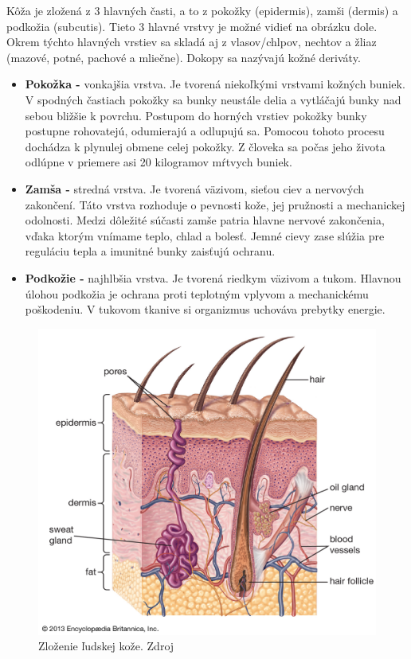 Kôža je zložená z 3 hlavných časti, a to z pokožky (epidermis), zamši (dermis) a podkožia (subcutis). Tieto 3 hlavné vrstvy je možné vidieť na obrázku dole. Okrem týchto hlavných vrstiev sa skladá aj z vlasov/chlpov, nechtov a žliaz (mazové, potné, pachové a mliečne). Dokopy sa nazývajú kožné deriváty. 
\begin{itemize}  
\item \textbf{Pokožka -} vonkajšia vrstva. Je tvorená niekoľkými vrstvami kožných buniek. V spodných častiach pokožky sa bunky neustále delia a vytláčajú bunky nad sebou bližšie k povrchu. Postupom do horných vrstiev pokožky bunky postupne rohovatejú, odumierajú a odlupujú sa. Pomocou tohoto procesu dochádza k plynulej obmene celej pokožky. Z človeka sa počas jeho života odlúpne v priemere asi 20 kilogramov mŕtvych buniek. 
\item \textbf{Zamša -} stredná vrstva. Je tvorená väzivom, sieťou ciev a nervových zakončení. Táto vrstva rozhoduje o pevnosti kože, jej pružnosti a mechanickej odolnosti. Medzi dôležité súčasti zamše patria hlavne nervové zakončenia, vďaka ktorým vnímame teplo, chlad a bolesť. Jemné cievy zase slúžia pre reguláciu tepla a imunitné bunky zaisťujú ochranu.
\item \textbf{Podkožie -} najhlbšia vrstva. Je tvorená riedkym väzivom a tukom. Hlavnou úlohou podkožia je ochrana proti teplotným vplyvom a mechanickému poškodeniu. V tukovom tkanive si organizmus uchováva prebytky energie. 
\end{itemize}
\begin{figure}[h]
  \centering
  \includegraphics[scale=0.20]{fig/koza.jpg}
  \caption{Zloženie ľudskej kože. Zdroj \cite{Ebling2016}}
  \label{fig:koza}
\end{figure}

